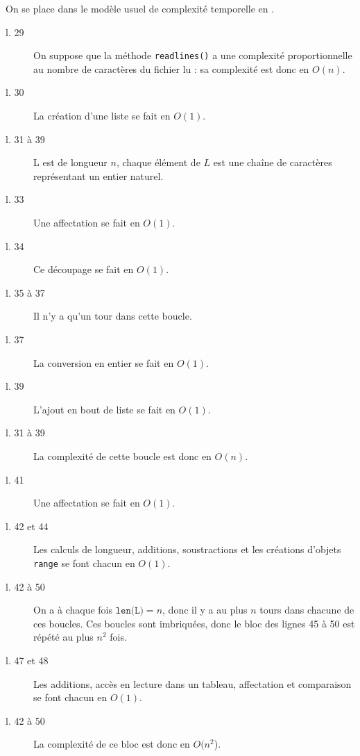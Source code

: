 On se place dans le modèle usuel de complexité temporelle  en \python. 
\begin{description}
  \item[l. 29] On suppose que la méthode \texttt{readlines()} a une complexité proportionnelle au nombre de caractères du fichier lu : sa complexité est donc en $O(n)$. 
  \item[l. 30] La création d'une liste se fait en $O(1)$.
  \item[l. 31 à 39] L est de longueur $n$, chaque élément de $L$ est une chaîne de caractères représentant un entier naturel. 
  \item[l. 33] Une affectation se fait en $O(1)$.
  \item[l. 34] Ce découpage se fait en $O(1)$.
  \item[l. 35 à 37] Il n'y a qu'un tour dans cette boucle. 
  \item[l. 37] La conversion en entier se fait en $O(1)$. 
  \item[l. 39] L'ajout en bout de liste se fait en $O(1)$. 
  \item[l. 31 à 39] La complexité de cette boucle est donc en $O(n)$. 
  \item[l. 41] Une affectation se fait en $O(1)$.
  \item[l. 42 et 44] Les calculs de longueur, additions, soustractions et les créations d'objets \texttt{range} se font chacun en $O(1)$. 
  \item[l. 42 à 50] On a à chaque fois $\texttt{len(L)}=n$, donc il y a au plus $n$ tours dans chacune de ces boucles. Ces boucles sont imbriquées, donc le bloc des lignes 45 à 50 est répété au plus $n^2$ fois. 
  \item[l. 47 et 48] Les additions, accès en lecture dans un tableau, affectation et comparaison se font chacun en $O(1)$. 
  \item[l. 42 à 50] La complexité de ce bloc est donc en $O(n^2$). 
\end{description}
